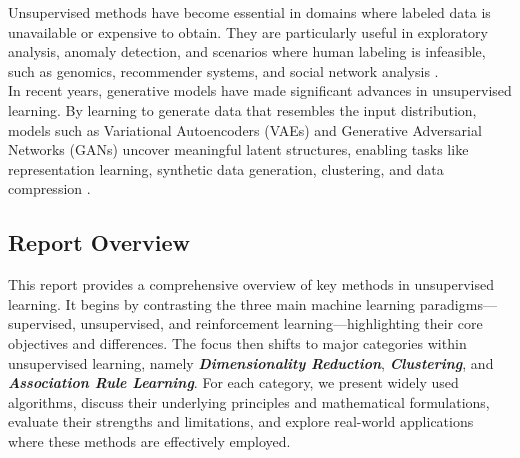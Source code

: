 \documentclass[conference]{IEEEtran}
\begin{document}
Unsupervised methods have become essential in domains where labeled data is unavailable or expensive to obtain. They are particularly useful in exploratory analysis, anomaly detection, and scenarios where human labeling is infeasible, such as genomics, recommender systems, and social network analysis \cite{socialmedia, gene}. \\

In recent years, generative models have made significant advances in unsupervised learning. By learning to generate data that resembles the input distribution, models such as Variational Autoencoders (VAEs) and Generative Adversarial Networks (GANs) uncover meaningful latent structures, enabling tasks like representation learning, synthetic data generation, clustering, and data compression \cite{generative}.

\subsection{Report Overview}
This report provides a comprehensive overview of key methods in unsupervised learning. It begins by contrasting the three main machine learning paradigms—supervised, unsupervised, and reinforcement learning—highlighting their core objectives and differences. The focus then shifts to major categories within unsupervised learning, namely \textit{\textbf{Dimensionality Reduction}}, \textit{\textbf{Clustering}}, and \textit{\textbf{Association Rule Learning}}. For each category, we present widely used algorithms, discuss their underlying principles and mathematical formulations, evaluate their strengths and limitations, and explore real-world applications where these methods are effectively employed.




 



\end{document}
